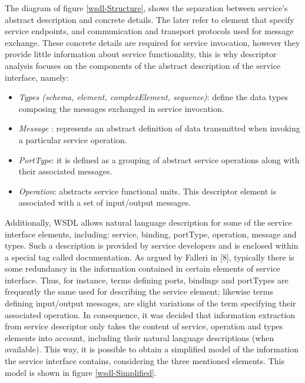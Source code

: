 The diagram of figure \ref{wsdl-Structure}, shows the separation between service’s abstract description and concrete details. The later refer to element that specify service endpoints, and communication and transport protocols used for message exchange. These concrete details are required for service invocation, however they provide little information about service functionality, this is why descriptor analysis focuses on the components of the abstract description of the service interface, namely:

\begin{itemize}
 \item \textit{Types (schema, element, complexElement, sequence)}: define the data types composing the messages exchanged in service invocation.
 \item \textit{Message} : represents an abstract definition of data transmitted when invoking a particular service operation.
 \item \textit{PortType}: it is defined as a grouping of abstract service operations along with their associated messages.
 \item \textit{Operation}: abstracts service functional units. This descriptor element is associated with a set of input/output messages.
\end{itemize}

Additionally, WSDL allows natural language description for some of the service interface elements, including: service, binding, portType, operation, message and types. Such a description is provided by service developers and is enclosed within a special tag called documentation. As argued by Falleri in [8], typically there is some redundancy in the information contained in certain elements of service interface. Thus, for instance, terms defining ports, bindings and portTypes are frequently the same used for describing the service element; likewise terms defining input/output messages, are slight variations of the term specifying their associated operation. In consequence, it was decided that information extraction from service descriptor only takes the content of service, operation and types elements into account, including their natural language descriptions (when available). This way, it is possible to obtain a simplified model of the information the service interface contains, considering the three mentioned elements. This model is shown in figure \ref{wsdl-Simplified}.

